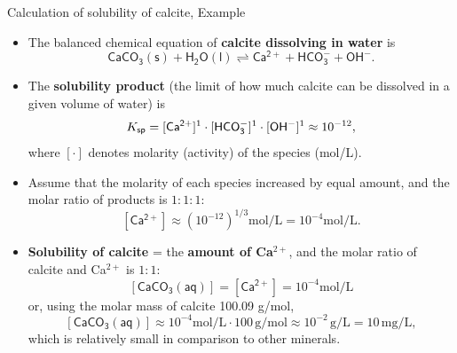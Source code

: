 \begin{frame}{Calculation of solubility of calcite, Example}
%
\footnotesize
\vskip 5pt
\begin{itemize}
\item The balanced chemical equation of {\bf calcite dissolving in water} is
\[
\mathsf{CaCO_3(s) + H_2O(l) \rightleftharpoons Ca^{2+} + HCO^{-}_3 + OH^{-} }.
\]
\vskip -5pt
%
\pause
\item The \alert{\bf solubility product} (the limit of how much calcite can be dissolved in a given volume of water) is
%
\[
K_{\sf sp} = [\mathsf{Ca^{2+}}]^1 \cdot [\mathsf{HCO^-_3}]^1 \cdot [\mathsf{OH^{-}}]^1 \approx 10^{-12},
\] 
where $[\cdot]$ denotes molarity (activity) of the species (mol/L). 
\pause
%
%
%
\item Assume that the molarity of each species increased by equal amount, 
and the molar ratio of products is $1 : 1 : 1$:
%
\[
[\mathsf{Ca^{2+}}] \approx (10^{-12})^{1/3} \mbox{mol/L} = 10^{-4} \mbox{mol/L}.
\] 
\vskip -10pt
%
\pause
\item \textbf{Solubility of calcite} = the \textbf{amount of Ca$^{2+}$}, and the molar ratio of calcite and Ca$^{2+}$ is $1 : 1$:
\[
[\mathsf{CaCO_3(aq)}] = [\mathsf{Ca^{2+}}] = 10^{-4} \mbox{mol/L} 
\]
%
or, using the molar mass of calcite 100.09 g/mol,
%
\[
[\mathsf{CaCO_3(aq)}] \approx 10^{-4}  \mbox{mol/L} \cdot 100 \, \mbox{g/mol} \approx 10^{-2} \,\mbox{g/L} = 10 \, \mbox{mg/L},
\]
%
which is relatively small in comparison to other minerals.
\end{itemize}
\end{frame}
%
%
